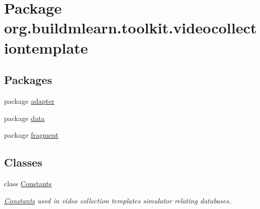 \hypertarget{namespaceorg_1_1buildmlearn_1_1toolkit_1_1videocollectiontemplate}{}\section{Package org.\+buildmlearn.\+toolkit.\+videocollectiontemplate}
\label{namespaceorg_1_1buildmlearn_1_1toolkit_1_1videocollectiontemplate}
\subsection*{Packages}
\begin{DoxyCompactItemize}
\item 
package \hyperlink{namespaceorg_1_1buildmlearn_1_1toolkit_1_1videocollectiontemplate_1_1adapter}{adapter}
\item 
package \hyperlink{namespaceorg_1_1buildmlearn_1_1toolkit_1_1videocollectiontemplate_1_1data}{data}
\item 
package \hyperlink{namespaceorg_1_1buildmlearn_1_1toolkit_1_1videocollectiontemplate_1_1fragment}{fragment}
\end{DoxyCompactItemize}
\subsection*{Classes}
\begin{DoxyCompactItemize}
\item 
class \hyperlink{classorg_1_1buildmlearn_1_1toolkit_1_1videocollectiontemplate_1_1Constants}{Constants}
\begin{DoxyCompactList}\small\item\em \hyperlink{classorg_1_1buildmlearn_1_1toolkit_1_1videocollectiontemplate_1_1Constants}{Constants} used in video collection template\textquotesingle{}s simulator relating databases. \end{DoxyCompactList}\end{DoxyCompactItemize}
